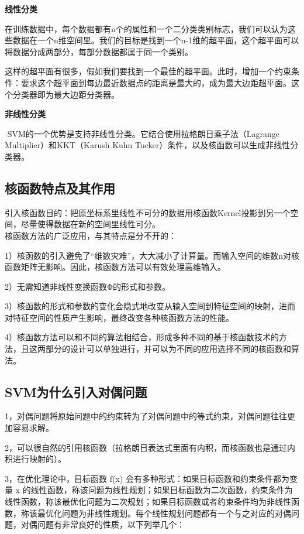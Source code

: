 \textbf{线性分类}

​
在训练数据中，每个数据都有n个的属性和一个二分类类别标志，我们可以认为这些数据在一个n维空间里。我们的目标是找到一个n-1维的超平面，这个超平面可以将数据分成两部分，每部分数据都属于同一个类别。

​
这样的超平面有很多，假如我们要找到一个最佳的超平面。此时，增加一个约束条件：要求这个超平面到每边最近数据点的距离是最大的，成为最大边距超平面。这个分类器即为最大边距分类器。

\textbf{非线性分类}

​ SVM的一个优势是支持非线性分类。它结合使用拉格朗日乘子法（Lagrange
Multiplier）和KKT（Karush Kuhn
Tucker）条件，以及核函数可以生成非线性分类器。

\subsection{核函数特点及其作用}\label{ux6838ux51fdux6570ux7279ux70b9ux53caux5176ux4f5cux7528}

​
引入核函数目的：把原坐标系里线性不可分的数据用核函数Kernel投影到另一个空间，尽量使得数据在新的空间里线性可分。\\
​ 核函数方法的广泛应用，与其特点是分不开的：

1）核函数的引入避免了``维数灾难''，大大减小了计算量。而输入空间的维数n对核函数矩阵无影响。因此，核函数方法可以有效处理高维输入。

2）无需知道非线性变换函数Φ的形式和参数。

3）核函数的形式和参数的变化会隐式地改变从输入空间到特征空间的映射，进而对特征空间的性质产生影响，最终改变各种核函数方法的性能。

4）核函数方法可以和不同的算法相结合，形成多种不同的基于核函数技术的方法，且这两部分的设计可以单独进行，并可以为不同的应用选择不同的核函数和算法。

\subsection{SVM为什么引入对偶问题}\label{svmux4e3aux4ec0ux4e48ux5f15ux5165ux5bf9ux5076ux95eeux9898}

1，对偶问题将原始问题中的约束转为了对偶问题中的等式约束，对偶问题往往更加容易求解。

2，可以很自然的引用核函数（拉格朗日表达式里面有内积，而核函数也是通过内积进行映射的）。

3，在优化理论中，目标函数 f(x)
会有多种形式：如果目标函数和约束条件都为变量 x
的线性函数，称该问题为线性规划；如果目标函数为二次函数，约束条件为线性函数，称该最优化问题为二次规划；如果目标函数或者约束条件均为非线性函数，称该最优化问题为非线性规划。每个线性规划问题都有一个与之对应的对偶问题，对偶问题有非常良好的性质，以下列举几个：


